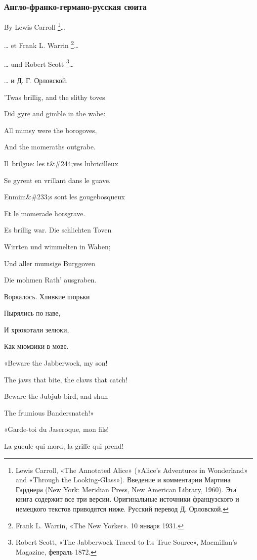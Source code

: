 \subsubsection{Англо-франко-германо-русская сюита}

By Lewis Carroll \footnote{Lewis Carroll, «The Annotated Alice» («Alice's Adventures in Wonderland» and «Through the Looking-Glass»). Введение и комментарии Мартина Гарднера (New York: Meridian Press, New American Library, 1960). Эта книга содержит все три версии. Оригинальные источники французского и немецкого текстов приводятся ниже. Русский перевод Д. Орловской.}\ldots{}

\ldots{} et Frank L. Warrin \footnote{Frank L. Warrin, «The New Yorker». 10 января 1931.}\ldots{}

\ldots{} und Robert Scott \footnote{Robert Scott, «The Jabberwock Traced to Its True Source», Macmillan's Magazine, февраль 1872.}\ldots{}

\ldots{} и Д. Г. Орловской.

'Twas brillig, and the slithy toves

Did gyre and gimble in the wabe:

All mimsy were the borogoves,

And the momeraths outgrabe.

Il~brilgue: les t\&\#244;ves lubricilleux

Se gyrent en vrillant dans le guave.

Enmim\&\#233;s sont les gougebosqueux

Et le momerade horsgrave.

Es brillig war. Die schlichten Toven

Wirrten und wimmelten in Waben;

Und aller mumsige Burggoven

Die mohmen Rath' ausgraben.

Воркалось. Хливкие шорьки

Пырялись по наве,

И хрюкотали зелюки,

Как мюмзики в мове.

«Beware the Jabberwock, my son!

The jaws that bite, the claws that catch!

Beware the Jubjub bird, and shun

The frumious Bandersnatch!»

«Garde-toi du Jaseroque, mon fils!

La gueule qui mord; la griffe qui prend!

